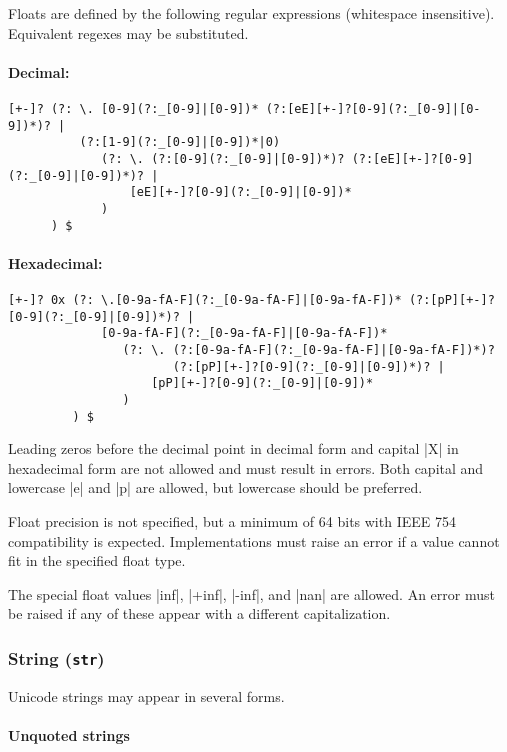 \documentclass[11pt]{article}
\begin{document}
Floats are defined by the following regular expressions (whitespace insensitive).  Equivalent regexes may be substituted.

\paragraph{Decimal:}
\begin{Verbatim}[fontsize=\small]
[+-]? (?: \. [0-9](?:_[0-9]|[0-9])* (?:[eE][+-]?[0-9](?:_[0-9]|[0-9])*)? |
          (?:[1-9](?:_[0-9]|[0-9])*|0)
             (?: \. (?:[0-9](?:_[0-9]|[0-9])*)? (?:[eE][+-]?[0-9](?:_[0-9]|[0-9])*)? |
                 [eE][+-]?[0-9](?:_[0-9]|[0-9])*
             )
      ) $
\end{Verbatim}

\paragraph{Hexadecimal:}
\begin{Verbatim}[fontsize=\small]
[+-]? 0x (?: \.[0-9a-fA-F](?:_[0-9a-fA-F]|[0-9a-fA-F])* (?:[pP][+-]?[0-9](?:_[0-9]|[0-9])*)? |
             [0-9a-fA-F](?:_[0-9a-fA-F]|[0-9a-fA-F])*
                (?: \. (?:[0-9a-fA-F](?:_[0-9a-fA-F]|[0-9a-fA-F])*)? 
                       (?:[pP][+-]?[0-9](?:_[0-9]|[0-9])*)? |
                    [pP][+-]?[0-9](?:_[0-9]|[0-9])*
                )
         ) $
\end{Verbatim}
Leading zeros before the decimal point in decimal form and capital |X| in hexadecimal form are not allowed and must result in errors.  Both capital and lowercase |e| and |p| are allowed, but lowercase should be preferred.

Float precision is not specified, but a minimum of 64 bits with IEEE 754 compatibility is expected.  Implementations must raise an error if a value cannot fit in the specified float type.

The special float values |inf|, |+inf|, |-inf|, and |nan| are allowed.  An error must be raised if any of these appear with a different capitalization.


\subsubsection{String (\texttt{str})}

Unicode strings may appear in several forms.

\paragraph{Unquoted strings}
\end{document}
